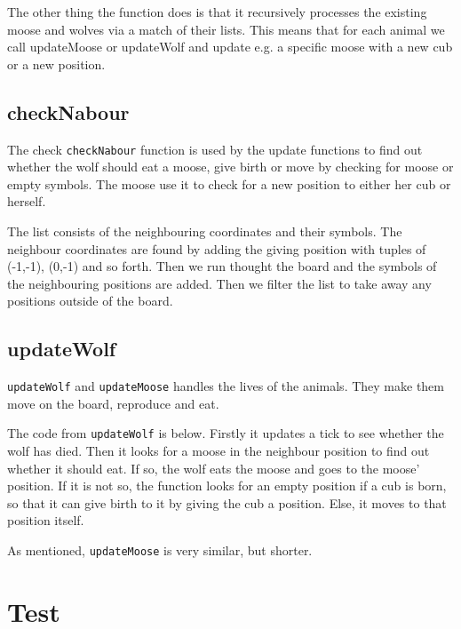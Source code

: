 \documentclass[a4paper]{report}
\begin{document}
The other thing the function does is that it recursively processes the existing moose and wolves via a match of their lists. This means that for each animal we call updateMoose or updateWolf and update e.g. a specific moose with a new cub or a new position.



\subsection{checkNabour}
The check \texttt{checkNabour} function is used by the update functions to find out whether the wolf should eat a moose, give birth or move by checking for moose or empty symbols. The moose use it to check for a new position to either her cub or herself.

The list consists of the neighbouring coordinates and their symbols. The neighbour coordinates are found by adding the giving position with tuples of (-1,-1), (0,-1) and so forth. Then we run thought the board and the symbols of the neighbouring positions are added. Then we filter the list to take away any positions outside of the board.





\subsection{updateWolf}

\texttt{updateWolf} and \texttt{updateMoose} handles the lives of the animals. They make them move on the board, reproduce and eat.

The code from \texttt{updateWolf} is below. Firstly it updates a tick to see whether the wolf has died. Then it looks for a moose in the neighbour position to find out whether it should eat. If so, the wolf eats the moose and goes to the moose' position. If it is not so, the function looks for an empty position if a cub is born, so that it can give birth to it by giving the cub a position. Else, it moves to that position itself. 

As mentioned, \texttt{updateMoose} is very similar, but shorter.




\section{Test}
\end{document}

